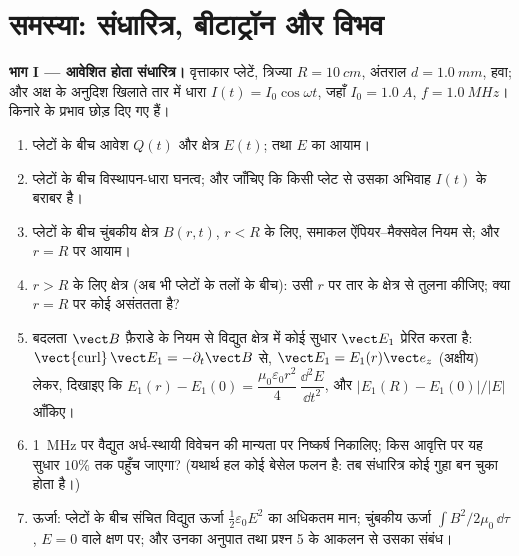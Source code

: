 \section{समस्या: संधारित्र, बीटाट्रॉन और विभव}

\begin{problem}
\label{pb:b2:maxwell-equations:1}

\medskip
\noindent\textbf{भाग I --- आवेशित होता संधारित्र।}
वृत्ताकार प्लेटें, त्रिज्या $R = \qty{10}{cm}$, अंतराल $d = \qty{1.0}{mm}$,
हवा; और अक्ष के अनुदिश खिलाते तार में धारा $I(t) = I_0\cos\omega t$, जहाँ $I_0 = \qty{1.0}{A}$, $f = \qty{1.0}{MHz}$।
किनारे के प्रभाव छोड़ दिए गए हैं।
\begin{enumerate}
  \item प्लेटों के बीच आवेश $Q(t)$ और क्षेत्र $E(t)$; तथा
        $E$ का आयाम।
  \item प्लेटों के बीच विस्थापन-धारा घनत्व; और जाँचिए कि
        किसी प्लेट से उसका अभिवाह $I(t)$ के बराबर है।
  \item प्लेटों के बीच चुंबकीय क्षेत्र $B(r, t)$, $r < R$ के लिए, समाकल
        ऐंपियर--मैक्सवेल नियम से; और $r = R$ पर आयाम।
  \item $r > R$ के लिए क्षेत्र (अब भी प्लेटों के तलों के बीच):
        उसी $r$ पर तार के क्षेत्र से तुलना कीजिए; क्या $r = R$ पर कोई
        असंततता है?
  \item बदलता $\vect B$ फ़ैराडे के नियम से विद्युत क्षेत्र में कोई सुधार
        $\vect E_1$ प्रेरित करता है: $\operatorname{\vect{curl}}\vect E_1
        = -\partial_t\vect B$ से, $\vect E_1 = E_1(r)\vect e_z$ (अक्षीय) लेकर, दिखाइए कि
        $E_1(r) - E_1(0) = \dfrac{\mu_0\varepsilon_0r^2}4\,\dfrac{\dd^2E}{\dd t^2}$, और
        $|E_1(R) - E_1(0)|/|E|$ आँकिए।
  \item \qty{1}{MHz} पर वैद्युत अर्ध-स्थायी विवेचन की मान्यता पर
        निष्कर्ष निकालिए; किस आवृत्ति पर यह सुधार
        $10\%$ तक पहुँच जाएगा? (यथार्थ हल कोई बेसेल फलन है: तब
        संधारित्र कोई गुहा बन चुका होता है।)
  \item ऊर्जा: प्लेटों के बीच संचित विद्युत ऊर्जा $\tfrac12\varepsilon_0E^2$ का
        अधिकतम मान; चुंबकीय ऊर्जा $\int B^2/2\mu_0\,\dd\tau$, $E = 0$ वाले क्षण पर;
        और उनका अनुपात तथा प्रश्न 5 के आकलन से उसका
        संबंध।
\end{enumerate}


\end{problem}
